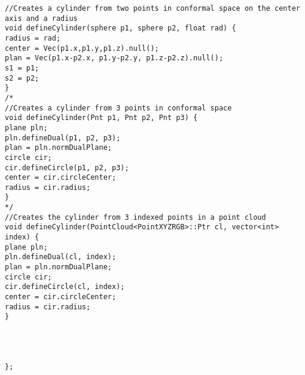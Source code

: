 {\begin{lstlisting}[caption={Archivo objects.h}]
//Creates a cylinder from two points in conformal space on the center axis and a radius
void defineCylinder(sphere p1, sphere p2, float rad) {
radius = rad;
center = Vec(p1.x,p1.y,p1.z).null();
plan = Vec(p1.x-p2.x, p1.y-p2.y, p1.z-p2.z).null();
s1 = p1;
s2 = p2;
}
/*
//Creates a cylinder from 3 points in conformal space
void defineCylinder(Pnt p1, Pnt p2, Pnt p3) {
plane pln;
pln.defineDual(p1, p2, p3);
plan = pln.normDualPlane;
circle cir;
cir.defineCircle(p1, p2, p3);
center = cir.circleCenter;
radius = cir.radius;
}
*/
//Creates the cylinder from 3 indexed points in a point cloud
void defineCylinder(PointCloud<PointXYZRGB>::Ptr cl, vector<int> index) {
plane pln;
pln.defineDual(cl, index);
plan = pln.normDualPlane;
circle cir;
cir.defineCircle(cl, index);
center = cir.circleCenter;
radius = cir.radius;
}




};


\end{lstlisting}
}$ $ \\

